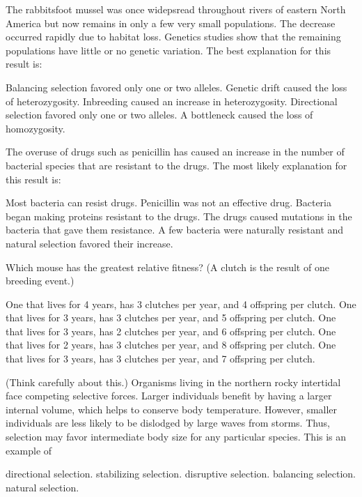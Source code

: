 \question
The rabbitsfoot mussel was once widepsread throughout rivers of eastern North America but now remains in only a few very small populations. The decrease occurred rapidly due to habitat loss. Genetics studies show that the remaining populations have little or no genetic variation. The best explanation for this result is:

\begin{choices}
\choice Balancing selection favored only one or two alleles. %
\correctchoice Genetic drift caused the loss of heterozygosity. %
\choice Inbreeding caused an increase in heterozygosity. %
\choice Directional selection favored only one or two alleles. %
\choice A bottleneck caused the loss of homozygosity. %
\end{choices}

\question
The overuse of drugs such as penicillin has caused an increase in the number of bacterial species that are resistant to the drugs. The most likely explanation for this result is:

\begin{choices}
\choice Most bacteria can resist drugs. %
\choice Penicillin was not an effective drug. %
\choice Bacteria began making proteins resistant to the drugs. %
\choice The drugs caused mutations in the bacteria that gave them resistance. %
\correctchoice A few bacteria were naturally resistant and natural selection favored their increase. %
\end{choices}

\question
Which mouse has the greatest relative fitness? (A clutch is the result of one breeding event.)

\begin{choices}
\choice One that lives for 4 years, has 3 clutches per year, and 4 offspring per clutch.%
\choice One that lives for 3 years, has 3 clutches per year, and 5 offspring per clutch.%
\choice One that lives for 3 years, has 2 clutches per year, and 6 offspring per clutch. %
\choice One that lives for 2 years, has 3 clutches per year, and 8 offspring per clutch. %
\correctchoice One that lives for 3 years, has 3 clutches per year, and 7 offspring per clutch. %
\end{choices}

\question
(Think carefully about this.) Organisms living in the northern rocky intertidal face competing selective forces. Larger individuals benefit by having a larger internal volume, which helps to conserve body temperature. However, smaller individuals are less likely to be dislodged by large waves from storms. Thus, selection may favor intermediate body size for any particular species. This is an example of

\begin{choices}
\choice directional selection. %
\choice stabilizing selection. %
\choice disruptive selection. %
\correctchoice balancing selection. %
\choice natural selection. %
\end{choices}
